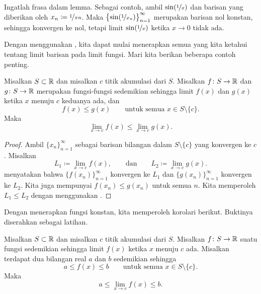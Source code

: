 Ingatlah frasa  dalam lemma.
Sebagai contoh, ambil $\sin(\nicefrac{1}{x})$ dan barisan yang diberikan oleh
$x_n \coloneqq \nicefrac{1}{\pi n}$.
Maka $\bigl\{ \sin (\nicefrac{1}{x_n}) \bigr\}_{n=1}^\infty$
merupakan barisan nol konstan, sehingga
konvergen ke nol, tetapi limit
$\sin(\nicefrac{1}{x})$ ketika $x \to 0$ tidak ada.

Dengan menggunakan ,
kita dapat mulai menerapkan semua yang kita ketahui tentang
limit barisan pada limit fungsi.  Mari kita berikan beberapa
contoh penting.

\begin{cor}
Misalkan $S \subset {\mathbb{R}}$ dan misalkan $c$ titik akumulasi dari $S$.
Misalkan $f \colon S \to
{\mathbb{R}}$ dan $g \colon S \to {\mathbb{R}}$ merupakan fungsi-fungsi
sedemikian sehingga
limit $f(x)$ dan $g(x)$ ketika $x$ menuju $c$ keduanya ada,
dan
\begin{equation*}
f(x) \leq g(x) \qquad \text{untuk semua } x \in S \setminus \{ c \}.
\end{equation*}
Maka
\begin{equation*}
\lim_{x\to c} f(x) \leq \lim_{x\to c} g(x) .
\end{equation*}
\end{cor}

\begin{proof}
Ambil $\{ x_n \}_{n=1}^\infty$ sebagai barisan bilangan dalam $S \setminus \{ c \}$
yang konvergen ke $c$.  Misalkan
\begin{equation*}
L_1 \coloneqq \lim_{x\to c} f(x), \qquad \text{dan} \qquad L_2 \coloneqq \lim_{x\to c} g(x) .
\end{equation*}
 menyatakan bahwa $\bigl\{ f(x_n) \bigr\}_{n=1}^\infty$ konvergen ke
$L_1$ dan $\bigl\{ g(x_n) \bigr\}_{n=1}^\infty$ konvergen ke $L_2$.  Kita juga
mempunyai $f(x_n) \leq g(x_n)$ untuk semua $n$.
Kita memperoleh $L_1 \leq L_2$ dengan menggunakan
.
\end{proof}

Dengan menerapkan fungsi konstan, kita memperoleh korolari berikut.  Buktinya
diserahkan sebagai latihan.

\begin{cor} \label{fconstineq:cor}
Misalkan $S \subset {\mathbb{R}}$ dan misalkan $c$ titik akumulasi dari $S$.  Misalkan $f \colon S \to
{\mathbb{R}}$ suatu fungsi sedemikian sehingga limit $f(x)$ ketika $x$ menuju $c$
ada.
Misalkan terdapat dua bilangan real $a$ dan $b$ sedemikian sehingga
\begin{equation*}
a \leq f(x) \leq b \qquad \text{untuk semua } x \in S \setminus \{ c \}.
\end{equation*}
Maka
\begin{equation*}
a \leq \lim_{x\to c} f(x) \leq b .
\end{equation*}
\end{cor}

